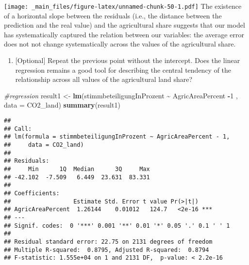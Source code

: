 \documentclass[
]{book}
\newenvironment{Shaded}{\begin{snugshade}}{\end{snugshade}}
\newcommand{\AttributeTok}[1]{\textcolor[rgb]{0.13,0.29,0.53}{#1}}
\newcommand{\CommentTok}[1]{\textcolor[rgb]{0.56,0.35,0.01}{\textit{#1}}}
\newcommand{\DecValTok}[1]{\textcolor[rgb]{0.00,0.00,0.81}{#1}}
\newcommand{\FunctionTok}[1]{\textcolor[rgb]{0.13,0.29,0.53}{\textbf{#1}}}
\newcommand{\NormalTok}[1]{#1}
\newcommand{\OtherTok}[1]{\textcolor[rgb]{0.56,0.35,0.01}{#1}}
\newcommand{\SpecialCharTok}[1]{\textcolor[rgb]{0.81,0.36,0.00}{\textbf{#1}}}
\providecommand{\tightlist}{%
  \setlength{\itemsep}{0pt}\setlength{\parskip}{0pt}}
\begin{document}
\texttt{[image: \_main\_files/figure-latex/unnamed-chunk-50-1.pdf]}
The existence of a horizontal slope between the residuals (i.e., the distance between the prediction and the real value) and the agricultural share suggests that our model has systematically captured the relation between our variables: the average error does not not change systematically across the values of the agricultural share.

\begin{enumerate}
\def\labelenumi{\roman{enumi}.}
\setcounter{enumi}{12}
\tightlist
\item
  {[}Optional{]} Repeat the previous point without the intercept. Does the linear regression remains a good tool for describing the central tendency of the relationship across all values of the agricultural land share?
\end{enumerate}

\begin{Shaded}
\begin{Highlighting}[]
\CommentTok{\#regression}
\NormalTok{result1 }\OtherTok{\textless{}{-}} \FunctionTok{lm}\NormalTok{(stimmbeteiligungInProzent }\SpecialCharTok{\textasciitilde{}}\NormalTok{ AgricAreaPercent }\SpecialCharTok{{-}}\DecValTok{1}\NormalTok{ , }\AttributeTok{data =}\NormalTok{ CO2\_land)}
\FunctionTok{summary}\NormalTok{(result1)}
\end{Highlighting}
\end{Shaded}

\begin{verbatim}
## 
## Call:
## lm(formula = stimmbeteiligungInProzent ~ AgricAreaPercent - 1, 
##     data = CO2_land)
## 
## Residuals:
##     Min      1Q  Median      3Q     Max 
## -42.102  -7.509   6.449  23.631  83.331 
## 
## Coefficients:
##                  Estimate Std. Error t value Pr(>|t|)    
## AgricAreaPercent  1.26144    0.01012   124.7   <2e-16 ***
## ---
## Signif. codes:  0 '***' 0.001 '**' 0.01 '*' 0.05 '.' 0.1 ' ' 1
## 
## Residual standard error: 22.75 on 2131 degrees of freedom
## Multiple R-squared:  0.8795, Adjusted R-squared:  0.8794 
## F-statistic: 1.555e+04 on 1 and 2131 DF,  p-value: < 2.2e-16
\end{verbatim}
\end{document}
